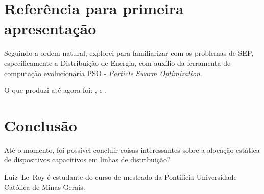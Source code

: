 \documentclass{IEEEtran}
\begin{document}
\section{Referência para primeira apresentação}
Seguindo a ordem natural, explorei \cite{del2008particle} para familiarizar com os problemas de SEP, especificamente a Distribuição de Energia, com auxílio da ferramenta de computação evolucionária PSO - \textit{Particle Swarm Optimization}.



O que produzi até agora foi: \cite{arruda2005calculation}, \cite{adriano2006modelos} e \cite{adriano2006efeitos}.


\section{Conclusão}
Até o momento, foi possível concluir coisas interessantes sobre a alocação estática de dispositivos capacitivos em linhas de distribuição?



\ifCLASSOPTIONcaptionsoff
  \newpage
\fi




\begin{IEEEbiographynophoto}{Luiz~Le~Roy}
é estudante do curso de mestrado da Pontif\'icia Universidade Cat\'olica de Minas Gerais.
\end{IEEEbiographynophoto}

\end{document}

